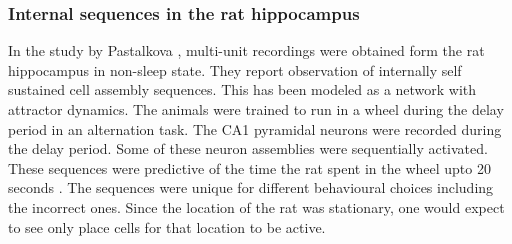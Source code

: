 \subsubsection{Internal sequences in the rat hippocampus}
In the study by Pastalkova \cite{Pastalkova2008a}, multi-unit recordings were obtained form the rat hippocampus in non-sleep state. They report observation of internally self sustained cell assembly sequences. This has been modeled as a network with attractor dynamics. The animals were trained to run in a wheel during the delay period in an alternation task. The CA1 pyramidal neurons were recorded during the delay period. Some of these neuron assemblies were sequentially activated. These sequences were predictive of the time the rat spent in the wheel upto 20 seconds \cite{Itskov2011a}. The sequences were unique for different behavioural choices including the incorrect ones. Since the location of the rat was stationary, one would expect to see only place cells for that location to be active.  \\  

